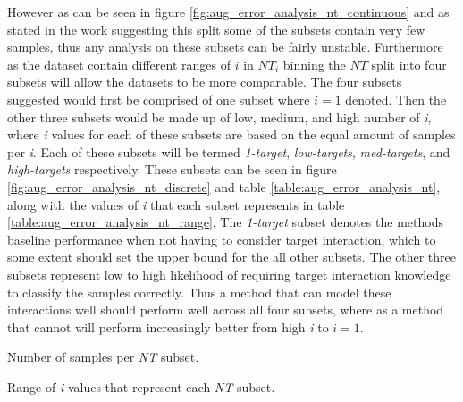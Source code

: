 However as can be seen in figure \ref{fig:aug_error_analysis_nt_continuous} and as stated in the work suggesting this split \citep{aug_zhang2019aspectbased} some of the subsets contain very few samples, thus any analysis on these subsets can be fairly unstable. Furthermore as the dataset contain different ranges of $i$ in $NT_i$ binning the $NT$ split into four subsets will allow the datasets to be more comparable. The four subsets suggested would first be comprised of one subset where $i=1$ denoted. Then the other three subsets would be made up of low, medium, and high number of \textit{i}, where \textit{i} values for each of these subsets are based on the equal amount of samples per \textit{i}. Each of these subsets will be termed  \textit{1-target}, \textit{low-targets}, \textit{med-targets}, and \textit{high-targets} respectively. These subsets can be seen in figure \ref{fig:aug_error_analysis_nt_discrete} and table \ref{table:aug_error_analysis_nt}, along with the values of \textit{i} that each subset represents in table \ref{table:aug_error_analysis_nt_range}. The \textit{1-target} subset denotes the methods baseline performance when not having to consider target interaction, which to some extent should set the upper bound for the all other subsets. The other three subsets represent low to high likelihood of requiring target interaction knowledge to classify the samples correctly. Thus a method that can model these interactions well should perform well across all four subsets, where as a method that cannot will perform increasingly better from high \textit{i} to $i=1$.
\begin{table}[!ht]
    \centering
    
    \caption{Number of samples per \textit{NT} subset.}
    \label{table:aug_error_analysis_nt}
\end{table}

\begin{table}[!ht]
    \centering
    
    \caption{Range of \textit{i} values that represent each \textit{NT} subset.}
    \label{table:aug_error_analysis_nt_range}
\end{table}

